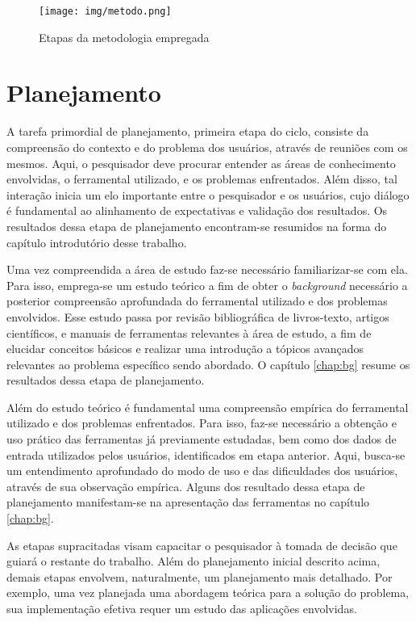 \documentclass[cic,tc]{iiufrgs}
\begin{document}
\begin{figure} \caption{Etapas da metodologia empregada} \begin{center}
\texttt{[image: img/metodo.png]} \end{center}
 \label{fig:metodo} \end{figure}

\section{Planejamento} \label{sec:plan}

A tarefa primordial de planejamento, primeira etapa do ciclo, consiste da
compreensão do contexto e do problema dos usuários, através de reuniões com os
mesmos. Aqui, o pesquisador deve procurar entender as áreas de conhecimento
envolvidas, o ferramental utilizado, e os problemas enfrentados. Além disso,
tal interação inicia um elo importante entre o pesquisador e os usuários, cujo
diálogo é fundamental ao alinhamento de expectativas e validação dos
resultados. Os resultados dessa etapa de planejamento encontram-se resumidos na
forma do capítulo introdutório desse trabalho.

Uma vez compreendida a área de estudo faz-se necessário familiarizar-se com
ela. Para isso, emprega-se um estudo teórico a fim de obter o
\textit{background} necessário a posterior compreensão aprofundada do
ferramental utilizado e dos problemas envolvidos. Esse estudo passa por revisão
bibliográfica de livros-texto, artigos científicos, e manuais de ferramentas
relevantes à área de estudo, a fim de elucidar conceitos básicos e realizar uma
introdução a tópicos avançados relevantes ao problema específico sendo
abordado. O capítulo \ref{chap:bg} resume os resultados dessa etapa de
planejamento.

Além do estudo teórico é fundamental uma compreensão empírica do ferramental
utilizado e dos problemas enfrentados. Para isso, faz-se necessário a obtenção
e uso prático das ferramentas já previamente estudadas, bem como dos dados de
entrada utilizados pelos usuários, identificados em etapa anterior. Aqui,
busca-se um entendimento aprofundado do modo de uso e das dificuldades dos
usuários, através de sua observação empírica. Alguns dos resultado dessa etapa
de planejamento manifestam-se na apresentação das ferramentas no capítulo
\ref{chap:bg}.

As etapas supracitadas visam capacitar o pesquisador à tomada de decisão que
guiará o restante do trabalho. Além do planejamento inicial descrito acima,
demais etapas envolvem, naturalmente, um planejamento mais detalhado. Por
exemplo, uma vez planejada uma abordagem teórica para a solução do problema,
sua implementação efetiva requer um estudo das aplicações envolvidas. 
\end{document}
